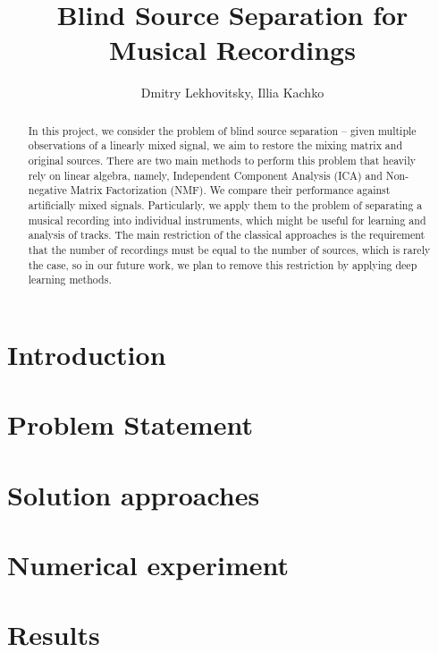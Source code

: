 \documentclass[a4paper,12pt]{article}
\title{ Blind Source Separation for Musical Recordings }
\author{ Dmitry Lekhovitsky, Illia Kachko }
\date{ }
\begin{document}
\maketitle

\begin{abstract}
	In this project, we consider the problem of blind source separation -- given multiple observations of a linearly mixed signal, we aim to restore the mixing matrix and original sources. There are two main methods to perform this problem that heavily rely on linear algebra, namely, Independent Component Analysis (ICA) and Non-negative Matrix Factorization (NMF). We compare their performance against artificially mixed signals.
	Particularly, we apply them to the problem of separating a musical recording into individual instruments, which might be useful for learning and analysis of tracks.
	The main restriction of the classical approaches is the requirement that the number of recordings must be equal to the number of sources, which is rarely the case, so in our future work, we plan to remove this restriction by applying deep learning methods.
\end{abstract}


\section{Introduction}


\section{Problem Statement}


\section{Solution approaches}


\section{Numerical experiment}


\section{Results}



	
\end{document}
